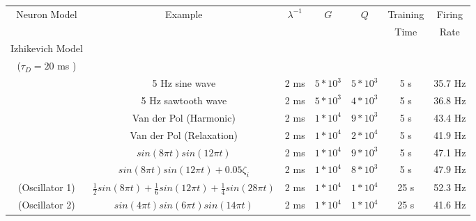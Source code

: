 \documentclass[11pt]{article} %
\begin{document}
\begin{table}
\begin{center}
  \begin{tabular}{ | c | c | c | c | c | c | c | }
    \hline
    Neuron Model & Example & $\lambda^{-1}$  & $G$ & $Q$ & Training & Firing  \\  
 & & & & & Time & Rate \\
\hline
\hline 
Izhikevich Model  & & & & & & \\
($\tau_D = 20$ ms )  & & & & & & \\
\hline
 & 5 Hz sine wave & 2 ms &  $5*10^3$ & $5*10^3$  & 5 s &  35.7 Hz  \\  
\hline 
 & 5 Hz sawtooth wave & 2 ms  & $5*10^3$ & $4*10^3$ & 5 s & 36.8 Hz \\  
\hline 
 & Van der Pol (Harmonic) & 2 ms & $1*10^4$ & $9*10^3$ & 5 s & 43.4 Hz \\  
\hline 
& Van der Pol (Relaxation) & 2 ms & $1*10^4$ & $2*10^4$ & 5 s & 41.9 Hz \\  
\hline 
& $sin(8\pi t)sin(12\pi t)$ & 2 ms & $1*10^4$ & $9*10^3$ & 5 s & 47.1 Hz \\  
\hline 
  & $sin(8\pi t)sin(12\pi t) + 0.05 \zeta_i$ & 2 ms & $1*10^4$ & $8*10^3$ & 5 s & 47.9 Hz \\  
\hline 
(Oscillator 1)& $\frac{1}{2}sin(8\pi t)+\frac{1}{6}sin(12\pi t) +\frac{1}{4}sin(28\pi t)  $ & 2 ms & $1*10^4$ & $1*10^4$ & 25 
s & 52.3 Hz \\  
\hline 
(Oscillator 2)& $sin(4\pi t)sin(6\pi t)sin(14\pi t)$  & 2 ms & $1*10^4$ & $1*10^4$ & 25 s & 41.6 Hz \\


\end{tabular}
\end{center}
\end{table}
\end{document}
